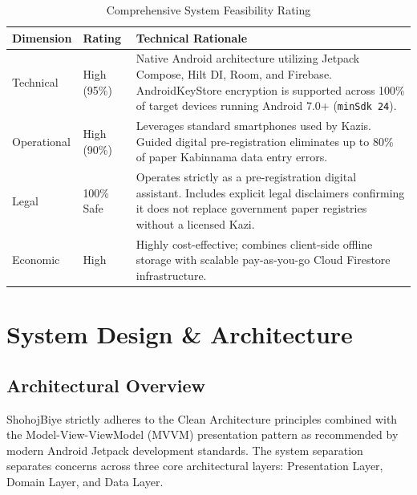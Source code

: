 \documentclass[12pt,a4paper]{article}
\begin{document}
	\begin{table}[h!]
		\centering
		\small
		\caption{Comprehensive System Feasibility Rating}
		\label{tab:feasibility_analysis}
		\begin{tabularx}{\textwidth}{@{}l l L@{}}
			\toprule
			\textbf{Dimension} & \textbf{Rating} & \textbf{Technical Rationale} \\ \midrule
			Technical & High (95\%) & Native Android architecture utilizing Jetpack Compose, Hilt DI, Room, and Firebase. AndroidKeyStore encryption is supported across 100\% of target devices running Android 7.0+ (\texttt{minSdk 24}). \\ \addlinespace
			Operational & High (90\%) & Leverages standard smartphones used by Kazis. Guided digital pre-registration eliminates up to 80\% of paper Kabinnama data entry errors. \\ \addlinespace
			Legal & 100\% Safe & Operates strictly as a pre-registration digital assistant. Includes explicit legal disclaimers confirming it does not replace government paper registries without a licensed Kazi. \\ \addlinespace
			Economic & High & Highly cost-effective; combines client-side offline storage with scalable pay-as-you-go Cloud Firestore infrastructure. \\ \bottomrule
		\end{tabularx}
	\end{table}
	
	\clearpage
	
	\section{System Design \& Architecture}
	
	\subsection{Architectural Overview}
	ShohojBiye strictly adheres to the Clean Architecture principles combined with the Model-View-ViewModel (MVVM) presentation pattern as recommended by modern Android Jetpack development standards. The system separation separates concerns across three core architectural layers: Presentation Layer, Domain Layer, and Data Layer.
	
\end{document}
